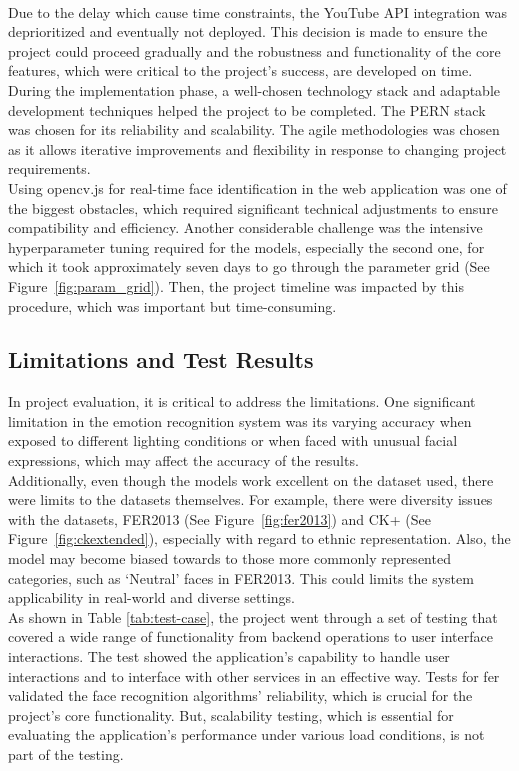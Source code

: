 \\
\indent Due to the delay which cause time constraints, the YouTube API integration was deprioritized and eventually not deployed.
This decision is made to ensure the project could proceed gradually and the robustness and functionality of the core features, which were critical to the project's success, are developed on time.
\\
\indent During the implementation phase, a well-chosen technology stack and adaptable development techniques helped the project to be completed.
The PERN stack was chosen for its reliability and scalability. 
The agile methodologies was chosen as it allows iterative improvements and flexibility in response to changing project requirements.
\\
\indent Using opencv.js for real-time face identification in the web application was one of the biggest obstacles, which required significant technical adjustments to ensure compatibility and efficiency.
Another considerable challenge was the intensive hyperparameter tuning required for the models, especially the second one, for which it took approximately seven days to go through the parameter grid (See Figure~\ref{fig:param_grid}). 
Then, the project timeline was impacted by this procedure, which was important but time-consuming.

\subsection{Limitations and Test Results}
In project evaluation, it is critical to address the limitations.
One significant limitation in the emotion recognition system was its varying accuracy when exposed to different lighting conditions or when faced with unusual facial expressions, which may affect the accuracy of the results.
\\
\indent Additionally, even though the models work excellent on the dataset used, there were limits to the datasets themselves.
For example, there were diversity issues with the datasets, FER2013 (See Figure~\ref{fig:fer2013}) and CK+ (See Figure~\ref{fig:ckextended}), especially with regard to ethnic representation.
Also, the model may become biased towards to those more commonly represented categories, such as `Neutral' faces in FER2013.
This could limits the system applicability in real-world and diverse settings.
\\
\indent As shown in Table \ref{tab:test-case}, the project went through a set of testing that covered a wide range of functionality from backend operations to user interface interactions.
The test showed the application's capability to handle user interactions and to interface with other services in an effective way. 
Tests for \gls{fer} validated the face recognition algorithms' reliability, which is crucial for the project's core functionality.
But, scalability testing, which is essential for evaluating the application's performance under various load conditions, is not part of the testing. 

